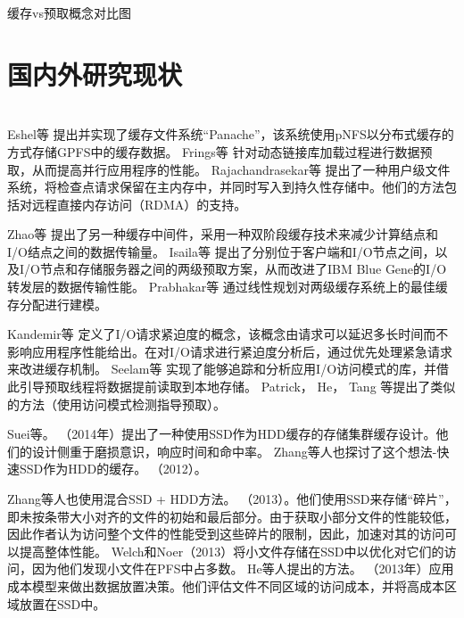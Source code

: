 {\color{red}缓存vs预取概念对比图}

\section{国内外研究现状}
\\



Eshel等\cite{Panache}
提出并实现了缓存文件系统“Panache”，该系统使用pNFS以分布式缓存的方式存储GPFS中的缓存数据。
Frings等\cite{Massively_Parallel_Loading}
针对动态链接库加载过程进行数据预取，从而提高并行应用程序的性能。
Rajachandrasekar等\cite{1PB}
提出了一种用户级文件系统，将检查点请求保留在主内存中，并同时写入到持久性存储中。他们的方法包括对远程直接内存访问（RDMA）的支持。

Zhao等\cite{HyCache+}
提出了另一种缓存中间件，采用一种双阶段缓存技术来减少计算结点和I/O结点之间的数据传输量。
Isaila等\cite{Multi_Leve_Data_Staging_for_Blue_Gene}
提出了分别位于客户端和I/O节点之间，以及I/O节点和存储服务器之间的两级预取方案，从而改进了IBM Blue Gene的I/O转发层的数据传输性能。
Prabhakar等\cite{Adaptive_Multi_level_Cache_Allocation_in_Distribute_Storage_Architectures}
通过线性规划对两级缓存系统上的最佳缓存分配进行建模。

Kandemir等\cite{On_Urgency_of_I/O_Operations}
定义了I/O请求紧迫度的概念，该概念由请求可以延迟多长时间而不影响应用程序性能给出。在对I/O请求进行紧迫度分析后，通过优先处理紧急请求来改进缓存机制。
Seelam等\cite{Masking_IO_latency_using_application_level_IO_caching_and_prefetching_on_Blue_Gene_systems}
实现了能够追踪和分析应用I/O访问模式的库，并借此引导预取线程将数据提前读取到本地存储。
Patrick\cite{Cashing_in_on_Hints_for_Better_Prefetching_and_Caching_in_PVFS_and_MPI_IO}，
He\cite{KNOWAC}，
Tang\cite{Improving_read_performance_with_online_access_pattern_analysis_and_prefetching}
等提出了类似的方法（使用访问模式检测指导预取）。


Suei等。 （2014年）提出了一种使用SSD作为HDD缓存的存储集群缓存设计。他们的设计侧重于磨损意识，响应时间和命中率。 Zhang等人也探讨了这个想法-快速SSD作为HDD的缓存。 （2012）。

Zhang等人也使用混合SSD + HDD方法。 （2013）。他们使用SSD来存储“碎片”，即未按条带大小对齐的文件的初始和最后部分。由于获取小部分文件的性能较低，因此作者认为访问整个文件的性能受到这些碎片的限制，因此，加速对其的访问可以提高整体性能。 Welch和Noer（2013）将小文件存储在SSD中以优化对它们的访问，因为他们发现小文件在PFS中占多数。 He等人提出的方法。 （2013年）应用成本模型来做出数据放置决策。他们评估文件不同区域的访问成本，并将高成本区域放置在SSD中。

